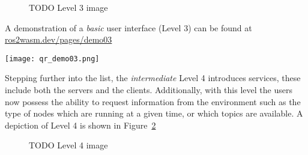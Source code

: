         \begin{figure}[htbp]
            \centering
            \caption{TODO Level 3 image}\label{fig:ui3}
        \end{figure}

        \begin{tcolorbox}[title=Example 3]
            \begin{minipage}[t]{0.87\linewidth}
                \vspace*{0.5\baselineskip}
                A demonstration of a \textit{basic} user interface (Level 3) can
                be found at \href{https://ros2wasm.dev/pages/demo03/index.html}{\textsf{ros2wasm.dev/pages/demo03}}
            \end{minipage}\hfill%
            \begin{minipage}[t]{0.1\linewidth}
                \vspace*{0pt}
                \texttt{[image: qr\_demo03.png]}
            \end{minipage}
        \end{tcolorbox}



        Stepping further into the list, the \textit{intermediate} Level 4 introduces
        services, these include both the servers and the clients. Additionally,
        with this level the users now possess the ability to request information
        from the environment such as the type of nodes which are running at a
        given time, or which topics are available. A depiction of Level 4 is shown
        in Figure~\ref{fig:ui4}

        \begin{figure}[htbp]
            \centering
            \caption{TODO Level 4 image}\label{fig:ui4}
        \end{figure}


